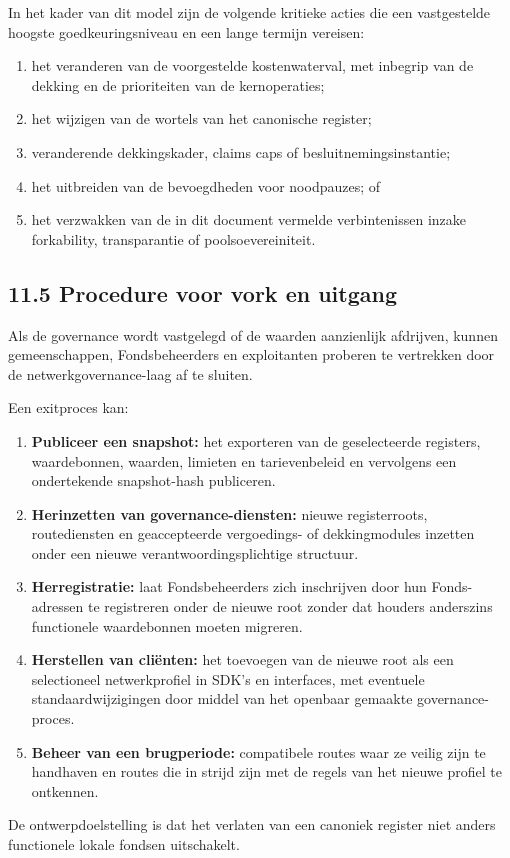 \documentclass[11pt]{article}
\begin{document}
In het kader van dit model zijn de volgende kritieke acties die een vastgestelde hoogste goedkeuringsniveau en een lange termijn vereisen:

\begin{enumerate}[leftmargin=*]
\item het veranderen van de voorgestelde kostenwaterval, met inbegrip van de dekking en de prioriteiten van de kernoperaties;
\item het wijzigen van de wortels van het canonische register;
\item veranderende dekkingskader, claims caps of besluitnemingsinstantie;
\item het uitbreiden van de bevoegdheden voor noodpauzes; of
\item het verzwakken van de in dit document vermelde verbintenissen inzake forkability, transparantie of poolsoevereiniteit.
\end{enumerate}
\subsection*{11.5 Procedure voor vork en uitgang}

Als de governance wordt vastgelegd of de waarden aanzienlijk afdrijven, kunnen gemeenschappen, Fondsbeheerders en exploitanten proberen te vertrekken door de netwerkgovernance-laag af te sluiten.

Een exitproces kan:

\begin{enumerate}[leftmargin=*]
\item \textbf{Publiceer een snapshot:} het exporteren van de geselecteerde registers, waardebonnen, waarden, limieten en tarievenbeleid en vervolgens een ondertekende snapshot-hash publiceren.
\item \textbf{Herinzetten van governance-diensten:} nieuwe registerroots, routediensten en geaccepteerde vergoedings- of dekkingmodules inzetten onder een nieuwe verantwoordingsplichtige structuur.
\item \textbf{Herregistratie:} laat Fondsbeheerders zich inschrijven door hun Fonds-adressen te registreren onder de nieuwe root zonder dat houders anderszins functionele waardebonnen moeten migreren.
\item \textbf{Herstellen van cliënten:} het toevoegen van de nieuwe root als een selectioneel netwerkprofiel in SDK's en interfaces, met eventuele standaardwijzigingen door middel van het openbaar gemaakte governance-proces.
\item \textbf{Beheer van een brugperiode:} compatibele routes waar ze veilig zijn te handhaven en routes die in strijd zijn met de regels van het nieuwe profiel te ontkennen.
\end{enumerate}
De ontwerpdoelstelling is dat het verlaten van een canoniek register niet anders functionele lokale fondsen uitschakelt.
\end{document}
